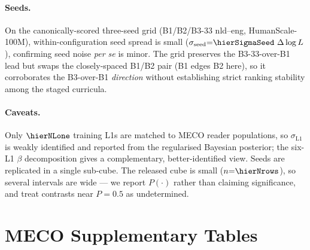 \paragraph{Seeds.} On the canonically-scored three-seed grid (B1/B2/B3-33 nld--eng, HumanScale-100M), within-configuration seed spread is small ($\sigma_{\mathrm{seed}}{=}\hierSigmaSeed~\Delta\log L$), confirming seed noise \emph{per se} is minor. The grid preserves the B3-33-over-B1 lead but swaps the closely-spaced B1/B2 pair (B1 edges B2 here), so it corroborates the B3-over-B1 \emph{direction} without establishing strict ranking stability among the staged curricula.
 
\paragraph{Caveats.} Only $\hierNLone$ training L1s are matched to MECO reader populations, so $\sigma_{\mathrm{L1}}$ is weakly identified and reported from the regularised Bayesian posterior; the six-L1 $\beta$ decomposition gives a complementary, better-identified view. Seeds are replicated in a single sub-cube. The released cube is small ($n{=}\hierNrows$), so several intervals are wide --- we report $P(\cdot)$ rather than claiming significance, and treat contrasts near $P{=}0.5$ as undetermined.
 
 
\section{MECO Supplementary Tables}\label{sec:supp-tables}
 
